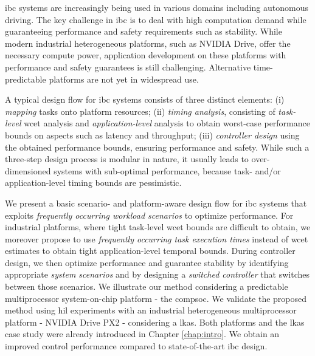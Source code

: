 \Gls{ibc} systems are increasingly being used in various domains including autonomous driving. The key challenge in \gls{ibc} is to deal with high computation demand while guaranteeing performance and safety requirements such as stability. 
While modern industrial heterogeneous platforms, such as NVIDIA Drive, offer the necessary compute power, application development on these platforms with performance and safety guarantees is still challenging. Alternative time-predictable platforms are not yet in widespread use.

A typical design flow for \gls{ibc} systems consists of three distinct elements: (i) \emph{mapping} tasks onto platform resources; (ii) \emph{timing analysis}, consisting of \emph{task-level} \gls{wcet} analysis and \emph{application-level} analysis to obtain worst-case performance bounds on aspects such as latency and throughput; (iii) \emph{controller design} using the obtained performance bounds, ensuring performance and safety. While such a three-step design process is modular in nature, it usually leads to over-dimensioned systems with sub-optimal performance, because task- and/or application-level timing bounds are pessimistic.

\begin{sloppypar}
We present a basic scenario- and platform-aware design flow for \gls{ibc} systems that exploits \textit{frequently occurring workload scenarios} to optimize performance. For industrial platforms, where tight task-level \gls{wcet} bounds are difficult to obtain, we moreover propose to use \textit{frequently occurring task execution times} instead of \gls{wcet} estimates to obtain tight application-level temporal bounds.  
During controller design, we then optimize performance and guarantee stability by identifying appropriate \textit{system scenarios} and by designing a \textit{switched controller} that switches between those scenarios. We illustrate our method considering a predictable multiprocessor system-on-chip platform - the \gls{compsoc}. 
We validate the proposed method using \gls{hil} experiments with an industrial heterogeneous multiprocessor platform - NVIDIA Drive PX2 - considering a \gls{lkas}. Both platforms and the \gls{lkas} case study were already introduced in Chapter \ref{chap:intro}. We obtain an improved control performance compared to state-of-the-art \gls{ibc} design.
\end{sloppypar}